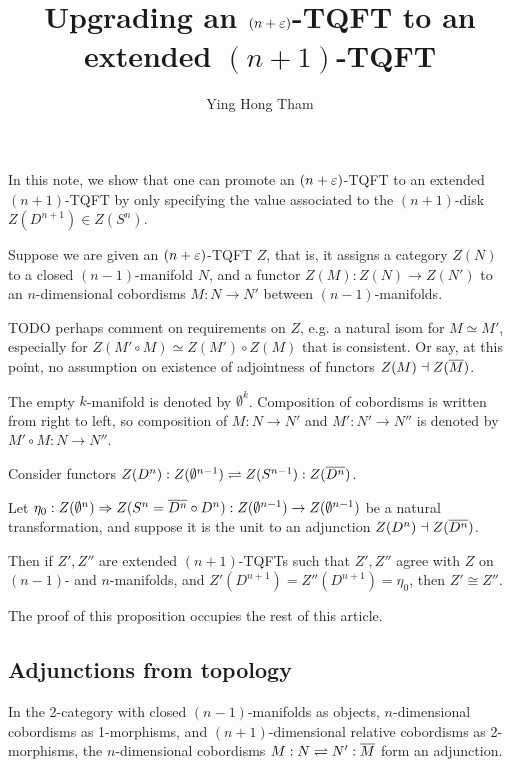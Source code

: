 \documentclass[12pt]{article}
\newcommand{\disk}[1]{{D^{#1}}}
\newcommand{\sphr}[1]{{S^{#1}}}
\newcommand{\empt}[1]{{\emptyset^{#1}}}
\begin{document}
\title{Upgrading an $(n+\varepsilon)$-TQFT to an extended $(n+1)$-TQFT}
\author{Ying Hong Tham}
\maketitle


In this note, we show that one can promote an
$(n+\varepsilon)$-TQFT to an extended $(n+1)$-TQFT
by only specifying the value associated to
the $(n+1)$-disk $Z(\disk{n+1}) \in Z(S^n)$.

Suppose we are given an $(n+\varepsilon)$-TQFT $Z$,
that is,
it assigns a category $Z(N)$ to a closed $(n-1)$-manifold $N$,
and a functor $Z(M):Z(N) \to Z(N')$ to an $n$-dimensional
cobordisms $M:N\to N'$ between $(n-1)$-manifolds.

TODO perhaps comment on requirements on $Z$,
e.g. a natural isom for $M \simeq M'$,
especially for $Z(M' \circ M) \simeq Z(M') \circ Z(M)$
that is consistent.
Or say, at this point, no assumption on existence of
adjointness of functors $Z(M) \dashv Z(\overline{M})$.

The empty $k$-manifold is denoted by $\empt{k}$.
Composition of cobordisms is written from right to left,
so composition of $M: N \to N'$ and $M' : N' \to N''$
is denoted by $M' \circ M: N \to N''$.

\begin{proposition}
\label{p:extend-uniqueness}
Consider functors
$Z(\disk{n}) : Z(\empt{n-1}) \rightleftharpoons
	Z(\sphr{n-1}) : Z(\ov{\disk{n}})$.

Let $\eta_0: Z(\empt{n}) \Rightarrow
	Z(\sphr{n} = \ov{\disk{n}} \circ \disk{n})
	: Z(\empt{n-1}) \to Z(\empt{n-1})$
be a natural transformation,
and suppose it is the unit to an adjunction
$Z(\disk{n}) \dashv Z(\ov{\disk{n}})$.

Then if $Z',Z''$ are extended $(n+1)$-TQFTs
such that $Z',Z''$ agree with $Z$ on $(n-1)$- and $n$-manifolds,
and $Z'(\disk{n+1}) = Z''(\disk{n+1}) = \eta_0$,
then $Z' \cong Z''$.
\end{proposition}


The proof of this proposition occupies the rest of this article.



\subsection{Adjunctions from topology}

In the 2-category with closed $(n-1)$-manifolds as objects,
$n$-dimensional cobordisms as 1-morphisms,
and $(n+1)$-dimensional relative cobordisms as 2-morphisms,
the $n$-dimensional cobordisms
$M: N \rightleftharpoons N' : \overline{M}$
form an adjunction.
\end{document}

